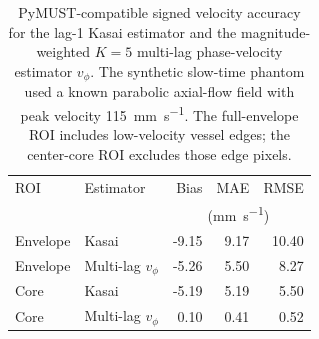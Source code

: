 \begin{table}[t]
\centering
\caption{PyMUST-compatible signed velocity accuracy for the lag-1
  Kasai estimator and the magnitude-weighted $K=5$ multi-lag
  phase-velocity estimator $v_\phi$.
  The synthetic slow-time phantom used a known parabolic axial-flow
  field with peak velocity \SI{115}{\milli\meter\per\second}.  The
  full-envelope ROI includes low-velocity vessel edges; the center-core
  ROI excludes those edge pixels.}
\label{tab:pymust_velocity_accuracy}
\footnotesize
\begin{tabular}{@{}llrrr@{}}
\toprule
ROI & Estimator & Bias & MAE & RMSE \\
 & & \multicolumn{3}{c}{(\si{\milli\meter\per\second})} \\
\midrule
Envelope & Kasai & -9.15 & 9.17 & 10.40 \\
Envelope & Multi-lag $v_\phi$ & -5.26 & 5.50 & 8.27 \\
Core & Kasai & -5.19 & 5.19 & 5.50 \\
Core & Multi-lag $v_\phi$ & 0.10 & 0.41 & 0.52 \\
\bottomrule
\end{tabular}
\end{table}
